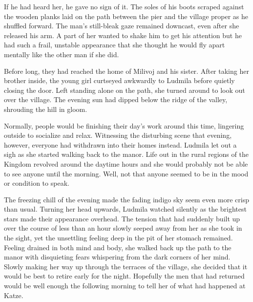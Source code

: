  

If he had heard her, he gave no sign of it. The soles of his boots scraped against the wooden planks laid on the path between the pier and the village proper as he shuffled forward. The man's still-bleak gaze remained downcast, even after she released his arm. A part of her wanted to shake him to get his attention but he had such a frail, unstable appearance that she thought he would fly apart mentally like the other man if she did.

 

Before long, they had reached the home of Milivoj and his sister. After taking her brother inside, the young girl curtseyed awkwardly to Ludmila before quietly closing the door. Left standing alone on the path, she turned around to look out over the village. The evening sun had dipped below the ridge of the valley, shrouding the hill in gloom.

 

Normally, people would be finishing their day’s work around this time, lingering outside to socialize and relax. Witnessing the disturbing scene that evening, however, everyone had withdrawn into their homes instead. Ludmila let out a sigh as she started walking back to the manor. Life out in the rural regions of the Kingdom revolved around the daytime hours and she would probably not be able to see anyone until the morning. Well, not that anyone seemed to be in the mood or condition to speak.

 

The freezing chill of the evening made the fading indigo sky seem even more crisp than usual. Turning her head upwards, Ludmila watched silently as the brightest stars made their appearance overhead. The tension that had suddenly built up over the course of less than an hour slowly seeped away from her as she took in the sight, yet the unsettling feeling deep in the pit of her stomach remained. Feeling drained in both mind and body, she walked back up the path to the manor with disquieting fears whispering from the dark corners of her mind. Slowly making her way up through the terraces of the village, she decided that it would be best to retire early for the night. Hopefully the men that had returned would be well enough the following morning to tell her of what had happened at Katze.